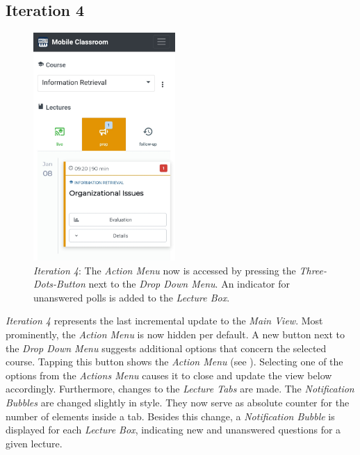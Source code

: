 \subsection{Iteration 4}
\begin{figure}
	\vspace*{-0.5cm}
	\begin{center}
		\includegraphics[width=0.48\textwidth]{screenshots/redesign/main_view_iteration_4.jpg}
	\end{center}
	\caption{\emph{Iteration 4}: The \emph{Action Menu} now is accessed by pressing the \emph{Three-Dots-Button} next to the \emph{Drop Down Menu}. An indicator for unanswered polls is added to the \emph{Lecture Box}.}
	\label{fig:main_view_iteration_4}
\end{figure}
\emph{Iteration 4} represents the last incremental update to the \emph{Main View}.
Most prominently, the  \emph{Action Menu} is now hidden per default. 
A new button next to the \emph{Drop Down Menu} suggests additional options that concern the selected course. Tapping this button shows the \emph{Action Menu} (see ). Selecting one of the options from the \emph{Actions Menu} causes it to close and update the view below accordingly.
Furthermore, changes to the \emph{Lecture Tabs} are made. The \emph{Notification Bubbles} are changed slightly in style. They now serve as absolute counter for the number of elements inside a tab.
Besides this change, a \emph{Notification Bubble} is displayed for each \emph{Lecture Box}, indicating new and unanswered questions for a given lecture.
\\
\\ 
